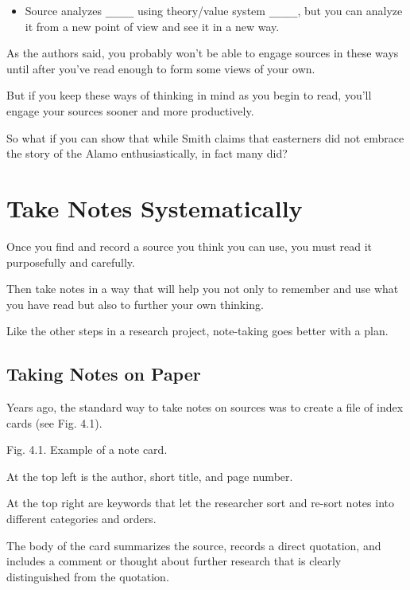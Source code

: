 \documentclass[oneside]{book}
\numberwithin{equation}{section}
\begin{document}
\begin{enumerate}
\begin{itemize}
        (The new or old context can be social, political, philosophical, historical, economic, ethical, gender specific, etc.)
        \item Source analyzes \verb|_____| using theory/value system \verb|_____|, but you can analyze it from a new point of view and see it in a new way.
    \end{itemize}
\end{enumerate}
As the authors said, you probably won't be able to engage sources in these ways until after you've read enough to form some views of your own.

But if you keep these ways of thinking in mind as you begin to read, you'll engage your sources sooner and more productively.

%

So what if you can show that while Smith claims that easterners did not embrace the story of the Alamo enthusiastically, in fact many did?

\section{Take Notes Systematically}
Once you find and record a source you think you can use, you must read it purposefully and carefully.

Then take notes in a way that will help you not only to remember and use what you have read but also to further your own thinking.

Like the other steps in a research project, note-taking goes better with a plan.

\subsection{Taking Notes on Paper}
Years ago, the standard way to take notes on sources was to create a file of index cards (see Fig. 4.1).

\textsf{Fig. 4.1. Example of a note card.}

At the top left is the author, short title, and page number.

At the top right are keywords that let the researcher sort and re-sort notes into different categories and orders.

The body of the card summarizes the source, records a direct quotation, and includes a comment or thought about further research that is clearly distinguished from the quotation.
\end{document}
